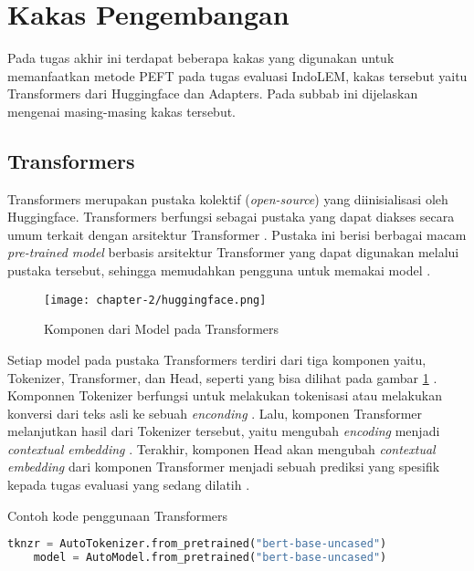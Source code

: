 \section{Kakas Pengembangan}

Pada tugas akhir ini terdapat beberapa kakas yang digunakan untuk memanfaatkan metode PEFT pada tugas evaluasi IndoLEM, kakas tersebut yaitu Transformers dari Huggingface dan Adapters. Pada subbab ini dijelaskan mengenai masing-masing kakas tersebut.

\subsection{Transformers}

Transformers merupakan pustaka kolektif (\textit{open-source}) yang diinisialisasi oleh Huggingface. Transformers berfungsi sebagai pustaka yang dapat diakses secara umum terkait dengan arsitektur Transformer \parencite{huggingface}. Pustaka ini berisi berbagai macam \textit{pre-trained model} berbasis arsitektur Transformer yang dapat digunakan melalui pustaka tersebut, sehingga memudahkan pengguna untuk memakai model \parencite{huggingface}.

\begin{figure}[h]
    \vspace{0.25cm}
    \centering
    \texttt{[image: chapter-2/huggingface.png]}
    \caption{Komponen dari Model pada Transformers \parencite{huggingface}}
    \label{fig:huggingface}
\end{figure}

Setiap model pada pustaka Transformers terdiri dari tiga komponen yaitu, Tokenizer, Transformer, dan Head, seperti yang bisa dilihat pada gambar \ref{fig:huggingface} \parencite{huggingface}. Komponnen Tokenizer berfungsi untuk melakukan tokenisasi atau melakukan konversi dari teks asli ke sebuah \textit{enconding} \parencite{huggingface}. Lalu, komponen Transformer melanjutkan hasil dari Tokenizer tersebut, yaitu mengubah \textit{encoding} menjadi \textit{contextual embedding} \parencite{huggingface}. Terakhir, komponen Head akan mengubah \textit{contextual embedding} dari komponen Transformer menjadi sebuah prediksi yang spesifik kepada tugas evaluasi yang sedang dilatih \parencite{huggingface}.

\begin{table}[h]
    \caption{Contoh kode penggunaan Transformers}
    \label{table:huggingface-model-code}
    \begin{lstlisting}[language=python]
    tknzr = AutoTokenizer.from_pretrained("bert-base-uncased")
    model = AutoModel.from_pretrained("bert-base-uncased")
    \end{lstlisting}
\end{table}

